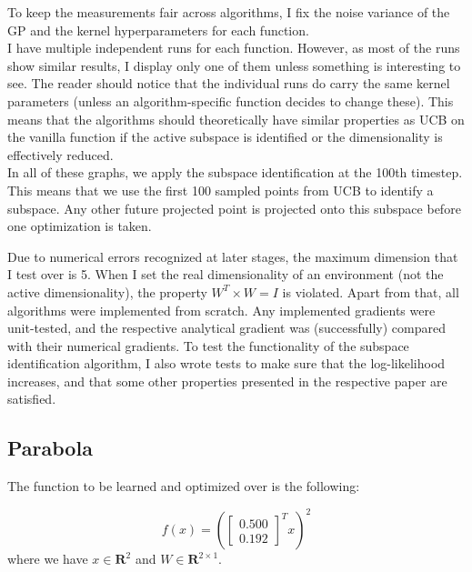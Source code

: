 To keep the measurements fair across algorithms, I fix the noise variance of the GP and the kernel hyperparameters for each function. \\

I have multiple independent runs for each function.
However, as most of the runs show similar results, I display only one of them unless something is interesting to see.
The reader should notice that the individual runs do carry the same kernel parameters (unless an algorithm-specific function decides to change these).
This means that the algorithms should theoretically have similar properties as UCB on the vanilla function if the active subspace is identified or the dimensionality is effectively reduced. \\

In all of these graphs, we apply the subspace identification at the 100th timestep.
This means that we use the first 100 sampled points from UCB to identify a subspace.
Any other future projected point is projected onto this subspace before one optimization is taken.

Due to numerical errors recognized at later stages, the maximum dimension that I test over is 5.
When I set the real dimensionality of an environment (not the active dimensionality), the property $W^T \times W = I$ is violated.
Apart from that, all algorithms were implemented from scratch.
Any implemented gradients were unit-tested, and the respective analytical gradient was (successfully) compared with their numerical gradients.
To test the functionality of the subspace identification algorithm, I also wrote tests to make sure that the log-likelihood increases, and that some other properties presented in the respective paper are satisfied.

\subsection{Parabola}

The function to be learned and optimized over is the following:

\def\WParaboa2D{
\begin{bmatrix}
    0.500\\
    0.192
\end{bmatrix}}

\begin{equation}
f(x) = \left( \WParaboa2D^T x \right)^2
\end{equation}
where we have $x \in \mathbf{R}^2$ and $W \in \mathbf{R}^{2 \times 1}$.


